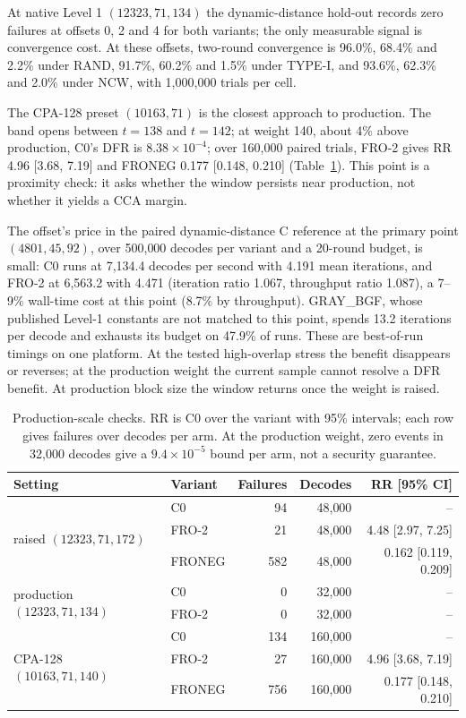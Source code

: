 \documentclass[runningheads,a4paper]{llncs}
\begin{document}
At native Level 1 $(12323,71,134)$ the dynamic-distance hold-out records zero failures at offsets 0, 2 and 4 for both variants; the only measurable signal is convergence cost. At these offsets, two-round convergence is 96.0\%, 68.4\% and 2.2\% under RAND, 91.7\%, 60.2\% and 1.5\% under TYPE-I, and 93.6\%, 62.3\% and 2.0\% under NCW, with 1{,}000{,}000 trials per cell.

The CPA-128 preset $(10163,71)$ is the closest approach to production. The band opens between $t=138$ and $t=142$; at weight 140, about 4\% above production, C0's DFR is $8.38\times10^{-4}$; over 160{,}000 paired trials, FRO-2 gives RR 4.96 [3.68, 7.19] and FRONEG 0.177 [0.148, 0.210] (Table~\ref{tab:added}). This point is a proximity check: it asks whether the window persists near production, not whether it yields a CCA margin.

The offset's price in the paired dynamic-distance C reference at the primary point $(4801,45,92)$, over 500{,}000 decodes per variant and a 20-round budget, is small: C0 runs at 7{,}134.4 decodes per second with 4.191 mean iterations, and FRO-2 at 6{,}563.2 with 4.471 (iteration ratio 1.067, throughput ratio 1.087), a 7--9\% wall-time cost at this point (8.7\% by throughput). GRAY\_BGF, whose published Level-1 constants are not matched to this point, spends 13.2 iterations per decode and exhausts its budget on 47.9\% of runs. These are best-of-run timings on one platform. At the tested high-overlap stress the benefit disappears or reverses; at the production weight the current sample cannot resolve a DFR benefit. At production block size the window returns once the weight is raised.

\begin{table}[!tb]
\centering
\footnotesize
\setlength{\tabcolsep}{3pt}
\caption{Production-scale checks. RR is C0 over the variant with 95\% intervals; each row gives failures over decodes per arm. At the production weight, zero events in 32{,}000 decodes give a $9.4\times10^{-5}$ bound per arm, not a security guarantee.}
\label{tab:added}
\begin{tabular}{@{}llrrr@{}}
\toprule
Setting & Variant & Failures & Decodes & RR [95\% CI] \\
\midrule
\multirow{3}{*}{raised $(12323,71,172)$} & C0 & 94 & 48{,}000 & -- \\
 & FRO-2 & 21 & 48{,}000 & 4.48 [2.97, 7.25] \\
 & FRONEG & 582 & 48{,}000 & 0.162 [0.119, 0.209] \\
\midrule
\multirow{2}{*}{production $(12323,71,134)$} & C0 & 0 & 32{,}000 & -- \\
 & FRO-2 & 0 & 32{,}000 & -- \\
\midrule
\multirow{3}{*}{CPA-128 $(10163,71,140)$} & C0 & 134 & 160{,}000 & -- \\
 & FRO-2 & 27 & 160{,}000 & 4.96 [3.68, 7.19] \\
 & FRONEG & 756 & 160{,}000 & 0.177 [0.148, 0.210] \\
\bottomrule
\end{tabular}
\end{table}
\end{document}
